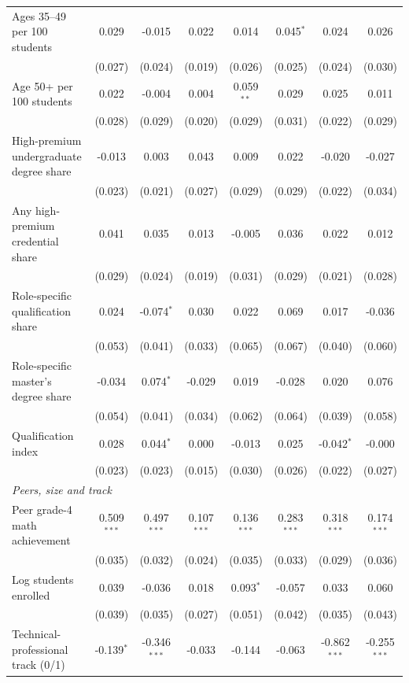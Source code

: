 \begin{table}[!htbp]
{\begin{tabular}{lccccccc}
\quad Ages 35--49 per 100 students & 0.029 & -0.015 & 0.022 & 0.014 & 0.045$^{*}$ & 0.024 & 0.026 \\
 & (0.027) & (0.024) & (0.019) & (0.026) & (0.025) & (0.024) & (0.030) \\
\quad Age 50+ per 100 students & 0.022 & -0.004 & 0.004 & 0.059$^{**}$ & 0.029 & 0.025 & 0.011 \\
 & (0.028) & (0.029) & (0.020) & (0.029) & (0.031) & (0.022) & (0.029) \\
\quad High-premium undergraduate degree share & -0.013 & 0.003 & 0.043 & 0.009 & 0.022 & -0.020 & -0.027 \\
 & (0.023) & (0.021) & (0.027) & (0.029) & (0.029) & (0.022) & (0.034) \\
\quad Any high-premium credential share & 0.041 & 0.035 & 0.013 & -0.005 & 0.036 & 0.022 & 0.012 \\
 & (0.029) & (0.024) & (0.019) & (0.031) & (0.029) & (0.021) & (0.028) \\
\quad Role-specific qualification share & 0.024 & -0.074$^{*}$ & 0.030 & 0.022 & 0.069 & 0.017 & -0.036 \\
 & (0.053) & (0.041) & (0.033) & (0.065) & (0.067) & (0.040) & (0.060) \\
\quad Role-specific master's degree share & -0.034 & 0.074$^{*}$ & -0.029 & 0.019 & -0.028 & 0.020 & 0.076 \\
 & (0.054) & (0.041) & (0.034) & (0.062) & (0.064) & (0.039) & (0.058) \\
\quad Qualification index & 0.028 & 0.044$^{*}$ & 0.000 & -0.013 & 0.025 & -0.042$^{*}$ & -0.000 \\
 & (0.023) & (0.023) & (0.015) & (0.030) & (0.026) & (0.022) & (0.027) \\
\multicolumn{8}{l}{\textit{Peers, size and track}} \\
\quad Peer grade-4 math achievement & 0.509$^{***}$ & 0.497$^{***}$ & 0.107$^{***}$ & 0.136$^{***}$ & 0.283$^{***}$ & 0.318$^{***}$ & 0.174$^{***}$ \\
 & (0.035) & (0.032) & (0.024) & (0.035) & (0.033) & (0.029) & (0.036) \\
\quad Log students enrolled & 0.039 & -0.036 & 0.018 & 0.093$^{*}$ & -0.057 & 0.033 & 0.060 \\
 & (0.039) & (0.035) & (0.027) & (0.051) & (0.042) & (0.035) & (0.043) \\
\quad Technical-professional track (0/1) & -0.139$^{*}$ & -0.346$^{***}$ & -0.033 & -0.144 & -0.063 & -0.862$^{***}$ & -0.255$^{***}$ \\

\end{tabular}}
\end{table}
